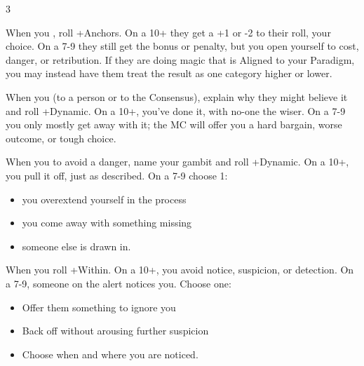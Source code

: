 \begin{multicols}{3}
  \SEPARATOR

  \begin{move}
    When you , roll +Anchors. On a 10+ they get a +1 or -2 to their roll, your choice. On a 7-9 they still get the bonus or penalty, but you open yourself to cost, danger, or retribution. If they are doing magic that is Aligned to your Paradigm, you may instead have them treat the result as one category higher or lower.

  \end{move}

  \columnbreak
    
  \begin{move}
    When you  (to a person or to the Consensus), explain why they might believe it and roll +Dynamic. On a 10+, you’ve done it, with no-one the wiser. On a 7-9 you only mostly get away with it; the MC will offer you a hard bargain, worse outcome, or tough choice.


  \end{move}

  \vspace{1em}
  
  \SEPARATOR

  \begin{move}
    When you  to avoid a danger, name your gambit and roll +Dynamic. On a 10+, you pull it off, just as described. On a 7-9 choose 1:

    \begin{itemize}
      \setlength\itemsep{0em}
    \item you overextend yourself in the process
    \item you come away with something missing
    \item someone else is drawn in.
    \end{itemize}
  \end{move}

  \SEPARATOR

  \begin{move}
    When you  roll +Within. On a 10+, you avoid notice, suspicion, or detection. On a 7-9, someone on the alert notices you. Choose one:

    \begin{itemize}
      \setlength\itemsep{0em}
    \item Offer them something to ignore you
    \item Back off without arousing further suspicion
    \item Choose when and where you are noticed.
    \end{itemize}
  \end{move}


\end{multicols}
